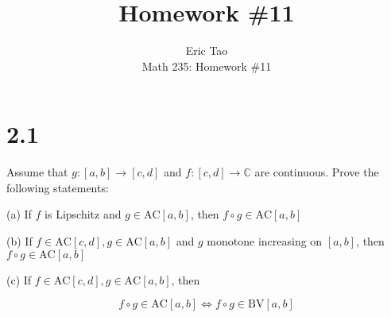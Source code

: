 \documentclass[10pt]{article}
\newcommand{\bv}{{\text{BV}}}
\newcommand{\ac}{{\text{AC}}}
\newenvironment{problem}[2][Problem]{\begin{trivlist}
\item[\hskip \labelsep {\bfseries #1}\hskip \labelsep {\bfseries #2.}]}{\end{trivlist}}
\begin{document}
 
\title{Homework \#11}
\author{Eric Tao\\
Math 235: Homework \#11}
\maketitle
 
\section*{2.1}

\begin{problem}{6.3.6}

Assume that $g: [a,b] \to [c,d]$ and $f: [c,d] \to \mathbb{C}$ are continuous. Prove the following statements:

(a) If $f$ is Lipschitz and $g \in \ac[a,b]$, then $f \circ g \in \ac[a,b]$

(b) If $f \in \ac[c,d], g \in \ac[a,b]$ and $g$ monotone increasing on $[a,b]$, then $f \circ g \in \ac[a,b]$

(c) If $f \in \ac[c,d], g \in \ac[a,b]$, then

$$ f \circ g \in \ac[a,b] \iff f \circ g \in \bv[a,b] $$

\end{problem}
\end{document}
